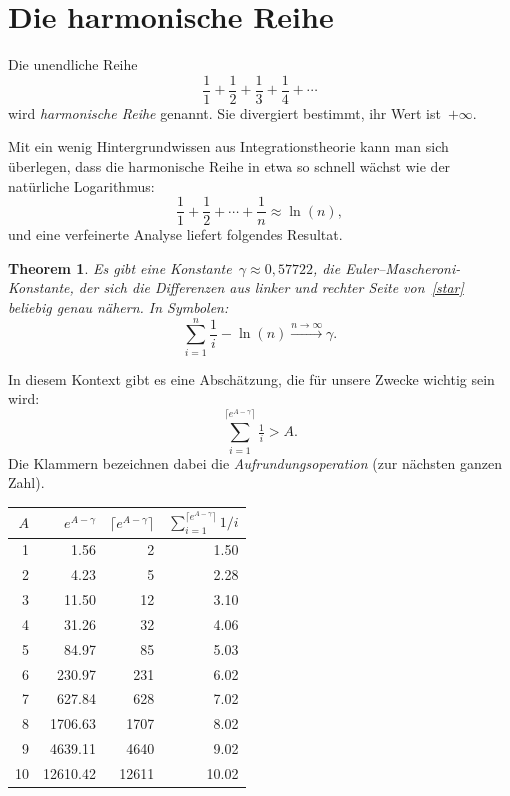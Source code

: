 \documentclass[twoside]{../zirkelblatt1415}
\theoremstyle{definition}
\theoremstyle{plain}
\newtheorem{thm}[defn]{Theorem}
\theoremstyle{remark}
\begin{document}
\section{Die harmonische Reihe}
\label{sect:harmonische-reihe}

Die unendliche Reihe
\[ \frac{1}{1} + \frac{1}{2} + \frac{1}{3} + \frac{1}{4} + \cdots \]
wird \emph{harmonische Reihe} genannt. Sie divergiert bestimmt, ihr Wert
ist~$+\infty$.\enlargethispage{1em}

Mit ein wenig Hintergrundwissen aus Integrationstheorie kann man sich
überlegen, dass die harmonische Reihe in etwa so schnell wächst wie der
natürliche Logarithmus:
\begin{equation}
  \label{star}
  \tag{$\star$}
  \frac{1}{1} + \frac{1}{2} + \cdots + \frac{1}{n} \approx \ln(n),
\end{equation}
und eine verfeinerte Analyse liefert folgendes Resultat.

\begin{thm}Es gibt eine Konstante~$\gamma \approx 0{,}57722$, die
\emph{Euler--Mascheroni-Konstante}, der sich die Differenzen aus linker und
rechter Seite von~\eqref{star} beliebig genau nähern. In Symbolen:
\[ \sum_{i=1}^n \frac{1}{i} - \ln(n) \xrightarrow{n \to \infty}
\gamma. \]
\end{thm}

In diesem Kontext gibt es eine Abschätzung, die für unsere Zwecke wichtig sein wird:
\[ \sum_{i=1}^{\lceil e^{A-\gamma} \rceil} \tfrac{1}{i} > A. \]
Die Klammern bezeichnen dabei die \emph{Aufrundungsoperation} (zur nächsten
ganzen Zahl).

\begin{center}\begin{tabular}{rrrr}
  \toprule
  $A$ & $e^{A-\gamma}$ & $\lceil e^{A-\gamma} \rceil$ & $\sum_{i=1}^{\lceil e^{A-\gamma} \rceil} 1/i$ \\\midrule
   1 &     1.56 &     2 &  1.50 \\
   2 &     4.23 &     5 &  2.28 \\
   3 &    11.50 &    12 &  3.10 \\
   4 &    31.26 &    32 &  4.06 \\
   5 &    84.97 &    85 &  5.03 \\
   6 &   230.97 &   231 &  6.02 \\
   7 &   627.84 &   628 &  7.02 \\
   8 &  1706.63 &  1707 &  8.02 \\
   9 &  4639.11 &  4640 &  9.02 \\
  10 & 12610.42 & 12611 & 10.02 \\
  \bottomrule
\end{tabular}\end{center}
\end{document}
